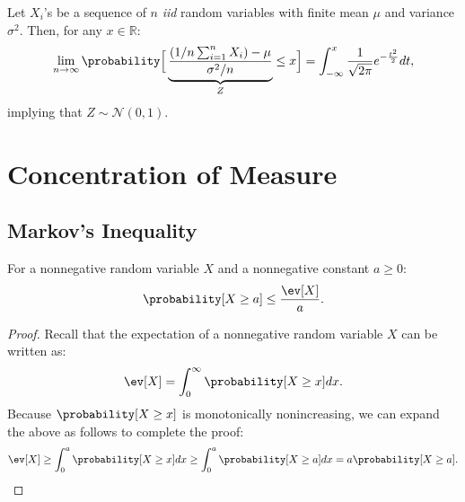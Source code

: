 \begin{theorem}
    Let $X_i$'s be a sequence of $n$ \emph{iid} random variables with finite mean $\mu$
    and variance $\sigma^2$. Then, for any $x \in \mathbb{R}$:
    \begin{equation*}
        \lim_{n \rightarrow \infty} \probability \Big[
            \underbrace{\frac{(1/n \sum_{i=1}^n X_i) - \mu}{\sigma^2/n}}_Z \leq x
        \Big] = \int_{-\infty}^x \frac{1}{\sqrt{2 \pi}} e^{-\frac{t^2}{2}} dt,
    \end{equation*}
    implying that $Z \sim \mathcal{N}(0, 1)$.
\end{theorem}

\chapter{Concentration of Measure}
\label{appendix:measure}


\section{Markov's Inequality}

\begin{lemma}
    \label{lemma:appendix:concentration:markov}
    For a nonnegative random variable $X$ and a nonnegative constant $a \geq 0$:
    \begin{equation*}
        \probability[X \geq a] \leq \frac{\ev[X]}{a}.
    \end{equation*}
\end{lemma}
\begin{proof}
    Recall that the expectation of a nonnegative random variable $X$ can be written
    as:
    \begin{equation*}
        \ev[X] = \int_0^\infty \probability[X \geq x] dx.
    \end{equation*}
    Because $\probability[X \geq x]$ is monotonically nonincreasing, we can expand
    the above as follows to complete the proof:
    \begin{equation*}
        \ev[X] \geq \int_0^a \probability[X \geq x] dx \geq \int_0^a \probability[X \geq a] dx = a \probability[X \geq a].
    \end{equation*}
\end{proof}

